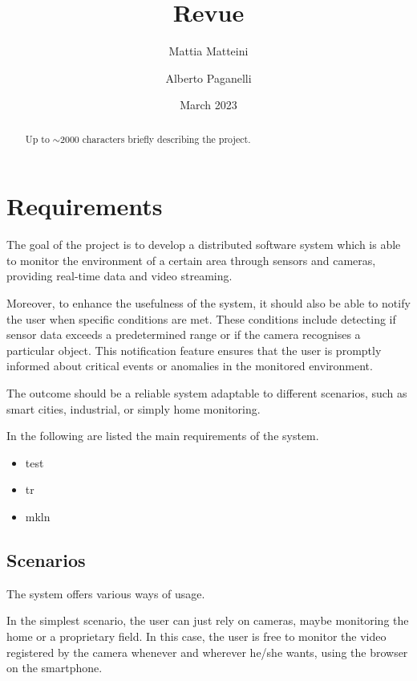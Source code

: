 \documentclass{scrartcl}
\title{
    Revue
}
\author{
    Mattia Matteini \\ \emailaddr{mattia.matteini@studio.unibo.it}
    \and
    Alberto Paganelli \\ \emailaddr{alberto.paganelli3@studio.unibo.it}
}
\date{March 2023}
\begin{document}
    \maketitle

    \begin{abstract}
        Up to $\sim$2000 characters briefly describing the project.
    \end{abstract}


    \section{Requirements}

    The goal of the project is to develop a distributed software system which is able to monitor the environment
    of a certain area through sensors and cameras, providing real-time data and video streaming.

    Moreover, to enhance the usefulness of the system, it should also be able to notify the user when specific
    conditions are met.
    These conditions include detecting if sensor data exceeds a predetermined range or if the camera
    recognises a particular object.
    This notification feature ensures that the user is promptly informed about critical
    events or anomalies in the monitored environment.

    The outcome should be a reliable system adaptable to different scenarios, such as smart cities, industrial, or
    simply home monitoring.

    In the following are listed the main requirements of the system.

    \begin{itemize}
        \item test
        \item tr
        \item mkln
    \end{itemize}

    \subsection{Scenarios}
    The system offers various ways of usage.

    In the simplest scenario, the user can just rely on cameras, maybe monitoring
    the home or a proprietary field.
    In this case, the user is free to monitor the video registered by the camera whenever and wherever he/she wants,
    using the browser on the smartphone.
\end{document}

